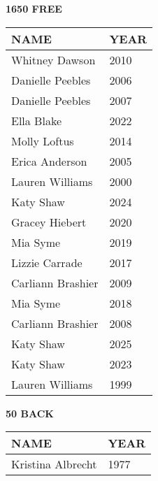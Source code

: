 \begin{minipage}[t]{0.48\textwidth}
\centering
\textbf{1650 FREE}\\[0.05cm]
\begin{tabular}{@{}p{2.8cm}p{1.2cm}@{}}
\hline
\textbf{NAME} & \textbf{YEAR} \\
\hline
Whitney Dawson & 2010 \\
Danielle Peebles & 2006 \\
Danielle Peebles & 2007 \\
Ella Blake & 2022 \\
Molly Loftus & 2014 \\
Erica Anderson & 2005 \\
Lauren Williams & 2000 \\
Katy Shaw & 2024 \\
Gracey Hiebert & 2020 \\
Mia Syme & 2019 \\
Lizzie Carrade & 2017 \\
Carliann Brashier & 2009 \\
Mia Syme & 2018 \\
Carliann Brashier & 2008 \\
Katy Shaw & 2025 \\
Katy Shaw & 2023 \\
Lauren Williams & 1999 \\
\hline
\end{tabular}
\end{minipage}\hfill
\begin{minipage}[t]{0.48\textwidth}
\centering
\textbf{50 BACK}\\[0.05cm]
\begin{tabular}{@{}p{2.8cm}p{1.2cm}@{}}
\hline
\textbf{NAME} & \textbf{YEAR} \\
\hline
Kristina Albrecht & 1977 \\
\hline
\end{tabular}
\end{minipage}

\vspace{0.4cm}

